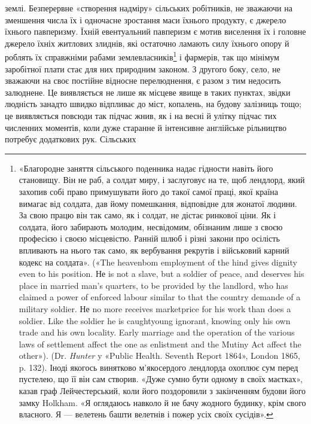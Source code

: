 \parcont{}  %
землі. Безперервне «створення надміру» сільських робітників,
не зважаючи на зменшення числа їх і одночасне зростання маси
їхнього продукту, є джерело їхнього павперизму. Їхній евентуальний
павперизм є мотив виселення їх і головне джерело їхніх житлових
злиднів, які остаточно ламають силу їхнього опору й роблять
їх справжніми рабами землевласників\footnote{
«Благородне заняття сільського поденника надає гідности навіть
його становищу. Він не раб, а солдат миру, і заслуговує на те, щоб лендлорд,
який захопив собі право примушувати його до такої самої праці,
якої країна вимагає від солдата, дав йому помешкання, відповідне для
жонатої людини. За свою працю він так само, як і солдат, не дістає ринкової
ціни. Як і солдата, його забирають молодим, несвідомим, обізнаним
лише з своєю професією і своєю місцевістю. Ранній шлюб і різні закони
про осілість впливають на нього так само, як вербування рекрутів і військовий
карний кодекс на солдата». («The heavenbom employment of
the hind gives dignity even to his position. Не is not a slave, but a soldier
of peace, and deserves his place in married man’s quarters, to be provided
by the landlord, who has claimed a power of enforced labour similar to that
the country demande of a military soldier. Не no more receives marketprice
for his work than does a soldier. Like the soldier he is caughtyoung
ignorant, knowing only his own trade and his own locality. Early marriage and
the operation of the various laws of settlement affect the one as enlistment
and the Mutiny Act affect the other»). (Dr. \emph{Hunter} y «Public Health. Seventh
Report 1864», London 1865, p. 132). Іноді якогось винятково м’якосердого
лендлорда охоплює сум перед пустелею, що її він сам створив. «Дуже
сумно бути одному в своїх маєтках», казав граф Лейчестерський, коли
його поздоровили з закінченням будови його замку Holkham. «Я оглядаюсь
навколо й не бачу жодного будинку, крім свого власного. Я — велетень
башти велетнів і пожер усіх своїх сусідів».
} і фармерів, так що мінімум
заробітної плати стає для них природним законом. З другого
боку, село, не зважаючи на своє постійне відносне перелюднення,
є разом з тим недосить залюднене. Це виявляється не лише як
місцеве явище в таких пунктах, звідки людність занадто швидко
відпливає до міст, копалень, на будову залізниць тощо; це виявляється
повсюди так підчас жнив, як і на весні й улітку підчас
тих численних моментів, коли дуже старанне й інтенсивне
англійське рільництво потребує додаткових рук. Сільських
